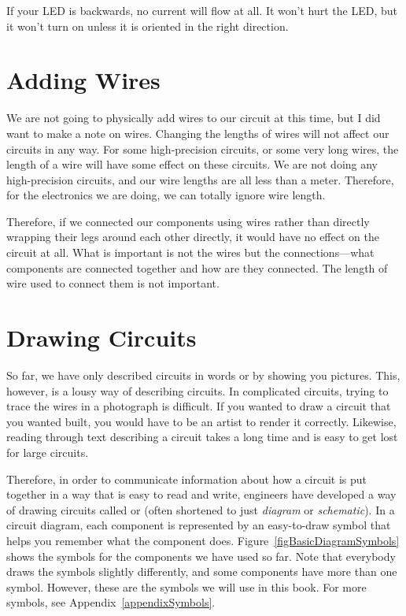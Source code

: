 If your LED is backwards, no current will flow at all. 
It won't hurt the LED, but it won't turn on unless it is oriented in the right direction.

\section{Adding Wires}
\label{secWireRule}

We are not going to physically add wires to our circuit at this time, but I did want to make a note on wires.
Changing the lengths of wires will not affect our circuits in any way.
For some high-precision circuits, or some very long wires, the length of a wire will have some effect on these circuits.
We are not doing any high-precision circuits, and our wire lengths are all less than a meter.
Therefore, for the electronics we are doing, we can totally ignore wire length.

Therefore, if we connected our components using wires rather than directly wrapping their legs around each other directly, it would have no effect on the circuit at all.
What is important is not the wires but the connections---what components are connected together and how are they connected.
The length of wire used to connect them is not important.

\section{Drawing Circuits}

So far, we have only described circuits in words or by showing you pictures.
This, however, is a lousy way of describing circuits.
In complicated circuits, trying to trace the wires in a photograph is difficult.
If you wanted to draw a circuit that you wanted built, you would have to be an artist to render it correctly.
Likewise, reading through text describing a circuit takes a long time and is easy to get lost for large circuits.

Therefore, in order to communicate information about how a circuit is put together in a way that is easy to read and write, engineers have developed a way of drawing circuits called  or  (often shortened to just \emph{diagram} or \emph{schematic}).
In a circuit diagram, each component is represented by an easy-to-draw symbol that helps you remember what the component does.
Figure~\ref{figBasicDiagramSymbols} shows the symbols for the components we have used so far.
Note that everybody draws the symbols slightly differently, and some components have more than one symbol.
However, these are the symbols we will use in this book.
For more symbols, see Appendix~\ref{appendixSymbols}.

